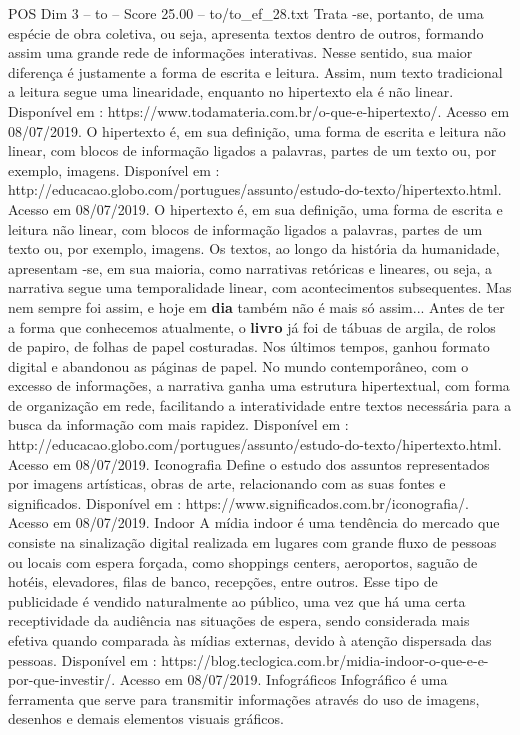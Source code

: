 \begin{textsample}{POS Dim 3 – to – Score 25.00 – to/to\_ef\_28.txt}
Trata -se, portanto, de uma espécie de obra coletiva, ou seja, apresenta textos dentro de outros, formando assim uma grande rede de informações interativas.
Nesse sentido, sua maior diferença é justamente a forma de escrita e leitura.
Assim, num texto tradicional a leitura segue uma linearidade, enquanto no hipertexto ela é não linear.
Disponível em : https://www.todamateria.com.br/o-que-e-hipertexto/.
Acesso em 08/07/2019.
O hipertexto é, em sua definição, uma forma de escrita e leitura não linear, com blocos de informação ligados a palavras, partes de um texto ou, por exemplo, imagens.
Disponível em : http://educacao.globo.com/portugues/assunto/estudo-do-texto/hipertexto.html.
Acesso em 08/07/2019.
O hipertexto é, em sua definição, uma forma de escrita e leitura não linear, com blocos de informação ligados a palavras, partes de um texto ou, por exemplo, imagens.
Os textos, ao longo da história da humanidade, apresentam -se, em sua maioria, como narrativas retóricas e lineares, ou seja, a narrativa segue uma temporalidade linear, com acontecimentos subsequentes.
Mas nem sempre foi assim, e hoje em \textbf{dia} também não é mais só assim...
Antes de ter a forma que conhecemos atualmente, o \textbf{livro} já foi de tábuas de argila, de rolos de papiro, de folhas de papel costuradas.
Nos últimos tempos, ganhou formato digital e abandonou as páginas de papel.
No mundo contemporâneo, com o excesso de informações, a narrativa ganha uma estrutura hipertextual, com forma de organização em rede, facilitando a interatividade entre textos necessária para a busca da informação com mais rapidez.
Disponível em : http://educacao.globo.com/portugues/assunto/estudo-do-texto/hipertexto.html.
Acesso em 08/07/2019.
Iconografia Define o estudo dos assuntos representados por imagens artísticas, obras de arte, relacionando com as suas fontes e significados.
Disponível em : https://www.significados.com.br/iconografia/.
Acesso em 08/07/2019.
Indoor A mídia indoor é uma tendência do mercado que consiste na sinalização digital realizada em lugares com grande fluxo de pessoas ou locais com espera forçada, como shoppings centers, aeroportos, saguão de hotéis, elevadores, filas de banco, recepções, entre outros.
Esse tipo de publicidade é vendido naturalmente ao público, uma vez que há uma certa receptividade da audiência nas situações de espera, sendo considerada mais efetiva quando comparada às mídias externas, devido à atenção dispersada das pessoas.
Disponível em : https://blog.teclogica.com.br/midia-indoor-o-que-e-e-por-que-investir/.
Acesso em 08/07/2019.
Infográficos Infográfico é uma ferramenta que serve para transmitir informações através do uso de imagens, desenhos e demais elementos visuais gráficos.

\end{textsample}
